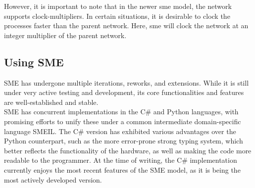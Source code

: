 However, it is important to note that in the newer \gls{sme} model, the network
supports clock-multipliers. In certain situations, it is desirable to clock the
processes faster than the parent network. Here, \gls{sme} will clock the
network at an integer multiplier of the parent network.

\subsection{Using SME}
SME has undergone multiple iterations, reworks, and extensions. While
it is still under very active testing and development, its core
functionalities and features
 are well-established and stable\cite{bus_centric_sme}.\\
SME has concurrent implementations in the C\# and Python languages,
with promising efforts to unify these under a common intermediate
domain-specific language SMEIL\cite{smeil}. The C\# version has
exhibited various advantages over the Python counterpart, such as
the more error-prone strong typing system, which better reflects the
functionality of the hardware, as well as making the code more readable to
the programmer. At the time of writing, the C\# implementation currently
enjoys the most recent features of the SME model, as it is being the
most actively developed version.


